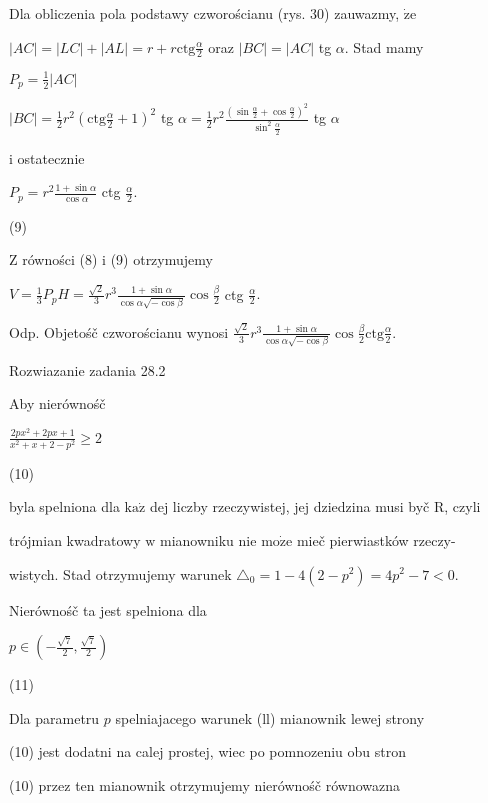 \documentclass[a4paper,12pt]{article}
\begin{document}
Dla obliczenia pola podstawy czworościanu (rys. 30) zauwazmy, $\dot{\mathrm{z}}\mathrm{e}$

$|AC|=|LC|+|AL|=r+r\displaystyle \mathrm{c}\mathrm{t}\mathrm{g}\frac{\alpha}{2}$ oraz $|BC|=|AC|$ tg $\alpha$. Stad mamy

$P_{p}=\displaystyle \frac{1}{2}|AC|$

$|BC|=\displaystyle \frac{1}{2}r^{2}(\mathrm{c}\mathrm{t}\mathrm{g}\frac{\alpha}{2}+1)^{2}$ tg $\displaystyle \alpha=\frac{1}{2}r^{2}\frac{(\sin\frac{\alpha}{2}+\cos\frac{\alpha}{2})^{2}}{\sin^{2}\frac{\alpha}{2}}$ tg $\alpha$

$\mathrm{i}$ ostatecznie

$P_{p}=r^{2}\displaystyle \frac{1+\sin\alpha}{\cos\alpha}$ ctg $\displaystyle \frac{\alpha}{2}.$

(9)

$\mathrm{Z}$ równości (8) $\mathrm{i}$ (9) otrzymujemy

$V=\displaystyle \frac{1}{3}P_{p}H=\frac{\sqrt{2}}{3}r^{3}\frac{1+\sin\alpha}{\cos\alpha\sqrt{-\cos\beta}}\cos\frac{\beta}{2}$ ctg $\displaystyle \frac{\alpha}{2}.$

Odp. Objetośč czworościanu wynosi $\displaystyle \frac{\sqrt{2}}{3}r^{3}\frac{1+\sin\alpha}{\cos\alpha\sqrt{-\cos\beta}}\cos\frac{\beta}{2}\mathrm{c}\mathrm{t}\mathrm{g}\frac{\alpha}{2}.$

Rozwiazanie zadania 28.2

Aby nierównośč

$\displaystyle \frac{2px^{2}+2px+1}{x^{2}+x+2-p^{2}}\geq 2$

(10)

byla spelniona dla $\mathrm{k}\mathrm{a}\dot{\mathrm{z}}$ dej liczby rzeczywistej, jej dziedzina musi byč $\mathrm{R}$, czyli

trójmian kwadratowy $\mathrm{w}$ mianowniku nie $\mathrm{m}\mathrm{o}\dot{\mathrm{z}}\mathrm{e}$ mieč pierwiastków rzeczy-

wistych. Stad otrzymujemy warunek $\triangle_{0} = 1-4(2-p^{2}) =4p^{2}-7< 0.$

Nierównośč ta jest spelniona dla

$p\displaystyle \in(-\frac{\sqrt{7}}{2},\frac{\sqrt{7}}{2})$

(11)

Dla parametru $p$ spelniajacego warunek (ll) mianownik lewej strony

(10) jest dodatni na calej prostej, wiec po pomnozeniu obu stron

(10) przez ten mianownik otrzymujemy nierównośč równowazna
\end{document}
